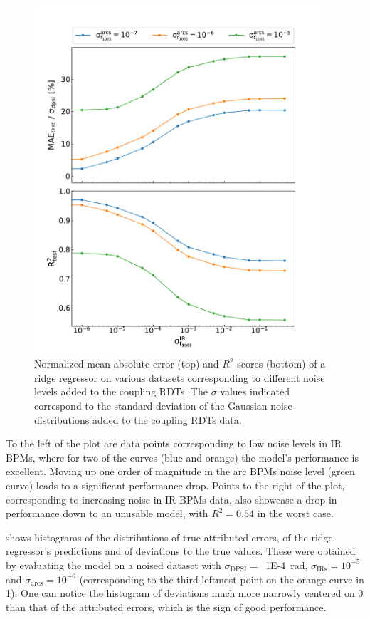\begin{figure}[!htb]
    \centering
    \includegraphics*[width=0.96\textwidth]{Figures/ML_for_IR_Coupling/ml_ridge_performance.pdf}
    \caption{Normalized mean absolute error (top) and \(R^2\) scores (bottom) of a ridge regressor on various datasets corresponding to different noise levels added to the coupling RDTs. The \(\sigma\) values indicated correspond to the standard deviation of the Gaussian noise distributions added to the coupling RDTs data.}
    \label{figure:ridge_performance}
\end{figure}

To the left of the plot are data points corresponding to low noise levels in IR BPMs, where for two of the curves (\textcolor{mplblue}{blue} and \textcolor{mplorange}{orange}) the model's performance is excellent.
Moving up one order of magnitude in the arc BPMs noise level (\textcolor{mplgreen}{green} curve) leads to a significant performance drop.
Points to the right of the plot, corresponding to increasing noise in IR BPMs data, also showcase a drop in performance down to an unusable model, with \(R^2 = 0.54\) in the worst case.

 shows histograms of the distributions of true attributed errors, of the ridge regressor's predictions and of deviations to the true values.
These were obtained by evaluating the model on a noised dataset with \(\sigma_{\mathrm{DPSI}} =\)~\qty{1E-4}{\radian}, \(\sigma_{\mathrm{IRs}} = 10^{-5}\) and \(\sigma_{\mathrm{arcs}} = 10^{-6}\) (corresponding to the third leftmost point on the \textcolor{mplorange}{orange} curve in \cref{figure:ridge_performance}).
One can notice the histogram of deviations much more narrowly centered on \num{0} than that of the attributed errors, which is the sign of good performance.

